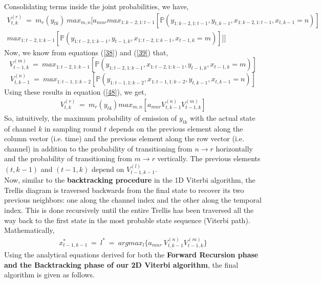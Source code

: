 \documentclass[12pt, draftcls, onecolumn]{IEEEtran}
\begin{document}
Consolidating terms inside the joint probabilities, we have,
\begin{equation}\label{48}
    \begin{aligned}
         V_{t,k}^{(r)}\ =\ m_r(y_{tk})\ max_{m,n}[a_{mnr}max_{1:k-2,1:t-1}[\mathbb P(y_{1:k-2,1:t-1},y_{t,k-1},x_{1:k-2,1:t-1},x_{t,k-1}=n)]\\max_{1:t-2,1:k-1}[\mathbb P(y_{1:t-2,1:k-1},y_{t-1,k},x_{1:t-2,1:k-1},x_{t-1,k}=m)]]]
    \end{aligned}
\end{equation}
Now, we know from equations (\ref{38}) and (\ref{39}) that,
\begin{equation*}
   V_{t-1,k}^{(m)}\ =\ max_{1:t-2,1:k-1}[\mathbb P(y_{1:t-2,1:k-1},x_{1:t-2,1:k-1},y_{t-1,k},x_{t-1,k}=m)]
\end{equation*}
\begin{equation*}
    V_{t,k-1}^{(n)}\ =\ max_{1:t-1,1:k-2}[\mathbb P(y_{1:t-1,1:k-2},x_{1:t-1,1:k-2},y_{t,k-1},x_{t,k-1}=n)]
\end{equation*}
Using these results in equation (\ref{48}), we get,
\begin{equation}\label{49}
    \begin{aligned}
         V_{t,k}^{(r)}\ =\ m_r(y_{tk})max_{m,n}[a_{mnr}V_{t,k-1}^{(n)}V_{t-1,k}^{(m)}]
    \end{aligned}
\end{equation}
So, intuitively, the maximum probability of emission of $y_{tk}$ with the actual state of channel $k$ in sampling round $t$ depends on the previous element along the column vector (i.e. time) and the previous element along the row vector (i.e. channel) in addition to the probability of transitioning from $n \longrightarrow r$ horizontally and the probability of transitioning from $m \longrightarrow r$ vertically. The previous elements $(t,k-1)$ and $(t-1,k)$ depend on $V_{t-1,k-1}^{(l)}$.
\\Now, similar to the \textbf{backtracking procedure} in the 1D Viterbi algorithm, the Trellis diagram is traversed backwards from the final state to recover its two previous neighbors: one along the channel index and the other along the temporal index. This is done recursively until the entire Trellis has been traversed all the way back to the first state in the most probable state sequence (Viterbi path).
\\Mathematically,
\begin{equation}\label{50}
    \begin{aligned}
         x_{t-1,k-1}^*\ =\ l^*\ =\ argmax_{l}\{a_{mnr}\ V_{t,k-1}^{(n)}V_{t-1,k}^{(m)}\}
    \end{aligned}
\end{equation}
Using the analytical equations derived for both the \textbf{Forward Recursion phase and the Backtracking phase of our 2D Viterbi algorithm}, the final algorithm is given as follows.
\end{document}
